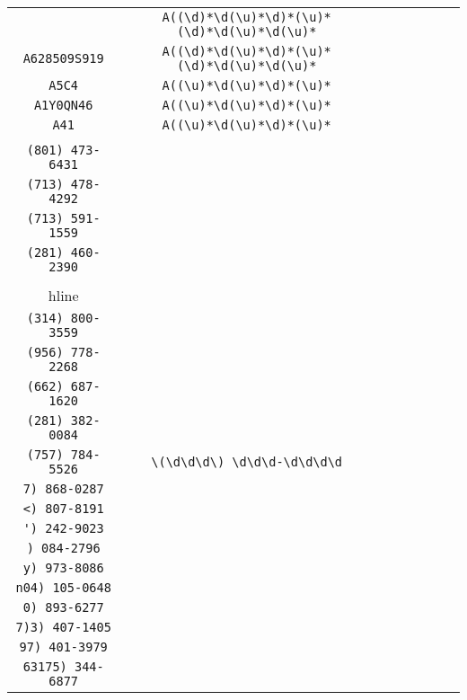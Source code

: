 \begin{longtable}{cccccccc}
\begin{tabular}{ll}
    \verb|A6146822JZX79745| & \verb|A((\d)*\d(\u)*\d)*(\u)*(\d)*\d(\u)*\d(\u)*|\\
\verb|A628509S919| & \verb|A((\d)*\d(\u)*\d)*(\u)*(\d)*\d(\u)*\d(\u)*|\\
\verb|A5C4| & \verb|A((\u)*\d(\u)*\d)*(\u)*|\\
\verb|A1Y0QN46| & \verb|A((\u)*\d(\u)*\d)*(\u)*|\\
\verb|A41| & \verb|A((\u)*\d(\u)*\d)*(\u)*|
\end{tabular}
\\\midrule 
\begin{tabular}{l}
    \verb|(281) 460-9574|\\
\verb|(801) 473-6431|\\
\verb|(713) 478-4292|\\
\verb|(713) 591-1559|\\
\verb|(281) 460-2390|\\
\\hline\\
\verb|(314) 800-3559|\\
\verb|(956) 778-2268|\\
\verb|(662) 687-1620|\\
\verb|(281) 382-0084|\\
\verb|(757) 784-5526|
\end{tabular}

&
\verb|\(\d\d\d\) \d\d\d-\d\d\d\d|
&

\begin{tabular}{l}
    \verb|(.)*(\d)*\) \d\d\d-\d\d\d\d|\\
\verb|7) 868-0287|\\
\verb|<) 807-8191|\\
\verb|') 242-9023|\\
\verb|) 084-2796|\\
\verb|y) 973-8086|
\end{tabular}

&

\begin{tabular}{l}
    \verb|(.)*(\d)*\d\) \d\d\d-\d\d\d\d|\\
\verb|n04) 105-0648|\\
\verb|0) 893-6277|\\
\verb|7)3) 407-1405|\\
\verb|97) 401-3979|\\
\verb|63175) 344-6877|
\end{tabular}

&


\end{longtable}
